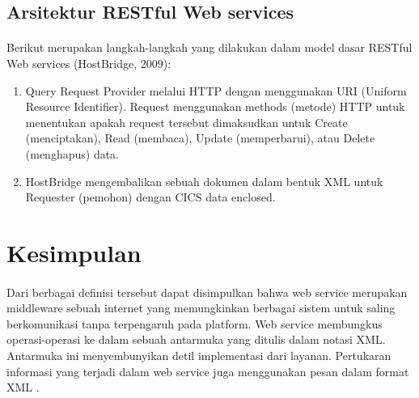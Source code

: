 \documentclass[12pt]{article}
\begin{document}
\subsection{Arsitektur RESTful Web services}
\paragraph{}
Berikut merupakan langkah-langkah yang dilakukan dalam model dasar RESTful Web services (HostBridge, 2009):
\begin{enumerate}
\item Query Request Provider melalui HTTP dengan menggunakan URI (Uniform Resource Identifier). Request menggunakan methods (metode) HTTP untuk menentukan apakah request tersebut dimaksudkan untuk Create (menciptakan), Read (membaca), Update (memperbarui), atau Delete (menghapus) data.
\item HostBridge mengembalikan sebuah dokumen dalam bentuk XML untuk Requester (pemohon) dengan CICS data enclosed\cite{arsana2014rancang}.
\end{enumerate}



\section{Kesimpulan}

\paragraph{}
Dari berbagai definisi tersebut dapat disimpulkan bahwa web service merupakan middleware sebuah internet yang memungkinkan berbagai sistem untuk saling berkomunikasi tanpa terpengaruh pada platform. Web service membungkus operasi-operasi ke dalam sebuah antarmuka yang ditulis dalam notasi XML. Antarmuka ini menyembunyikan detil implementasi dari layanan. Pertukaran informasi yang terjadi dalam web service juga menggunakan pesan dalam format XML \cite{saputra2integrasi}.




\end{document}
